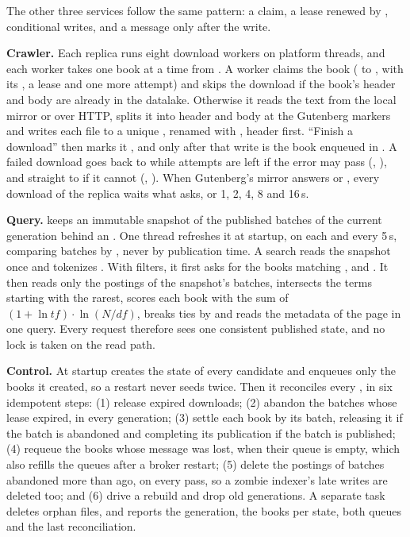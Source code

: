 The other three services follow the same pattern: a claim, a lease renewed by , conditional
writes, and a message only after the write.

\textbf{Crawler.} Each replica runs eight download workers on platform threads, and each worker takes one book at a
time from . A worker claims the book ( to , with its
, a lease and one more attempt) and skips the download if the book's header and body are already in the
datalake.
Otherwise it reads the text from the local mirror or over HTTP, splits it into header and body at the Gutenberg markers
and writes each file to a unique , renamed with , header first. ``Finish a download'' then
marks it , and only after that write is the book enqueued in . A failed download
goes back to  while attempts are left if the error may pass (,
), and straight to  if it cannot (, ). When
Gutenberg's mirror answers  or , every download of the replica waits what  asks,
or 1, 2, 4, 8 and 16\,s.

\textbf{Query.}  keeps an immutable snapshot of the published batches of the current generation behind an
. One thread refreshes it at startup, on each  and every 5\,s, comparing
batches by , never by publication time. A search reads the snapshot once and tokenizes . With
filters, it first asks  for the books matching ,  and
. It then reads only the postings of the snapshot's batches, intersects the terms starting with the rarest,
scores each book with the sum of $(1 + \ln tf) \cdot \ln(N/df)$, breaks ties by  and reads the metadata of
the page in one query. Every request therefore sees one consistent published state, and no lock is taken on the read
path.

\textbf{Control.} At startup  creates the state of every candidate and enqueues only the books it
created, so a restart never seeds twice. Then it reconciles every , in six idempotent
steps: (1) release expired downloads; (2) abandon the  batches whose lease expired, in every generation;
(3) settle each  book by its batch, releasing it if the batch is abandoned and completing its publication
if the batch is published; (4) requeue the books whose message was lost, when their queue is empty, which also refills
the queues after a broker restart; (5) delete the postings of batches abandoned more than 
ago, on every pass, so a zombie indexer's late writes are deleted too; and (6) drive a rebuild and drop old
generations. A separate task deletes orphan  files, and  reports the generation,
the books per state, both queues and the last reconciliation.

